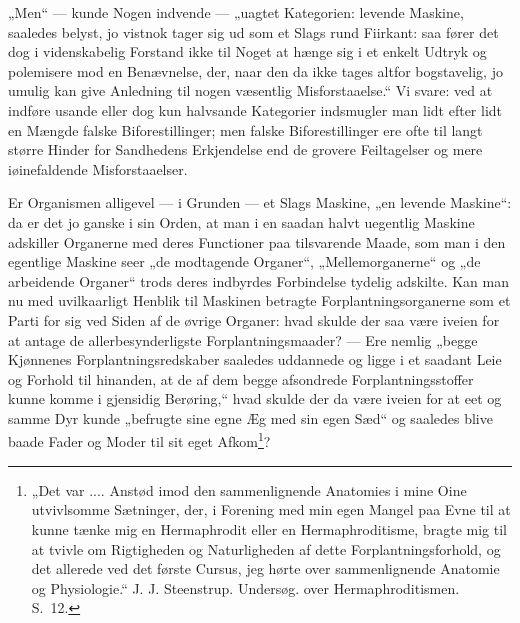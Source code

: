 \documentclass[11pt]{book}
\newcommand{\opage}[1]{\marginnote{\footnotesize\textit{[#1]}}}
\begin{document}
\opage{356} \setcounter{footnote}{0}%
„Men“ --- kunde Nogen indvende --- „uagtet Kategorien: levende
Maskine, saaledes belyst, jo vistnok tager sig ud som et Slags rund
Fiirkant: saa fører det dog i videnskabelig Forstand ikke til Noget at
hænge sig i et enkelt Udtryk og polemisere mod en Benævnelse, der,
naar den da ikke tages altfor bogstavelig, jo umulig kan give
Anledning til nogen væsentlig Misforstaaelse.“ Vi svare: ved at
indføre usande eller dog kun halvsande Kategorier indsmugler man lidt
efter lidt en Mængde falske Biforestillinger; men falske
Biforestillinger ere ofte til langt større Hinder for Sandhedens
Erkjendelse end de grovere Feiltagelser og mere iøinefaldende
Misforstaaelser.

\opage{357} \setcounter{footnote}{0}%
Er Organismen alligevel --- i Grunden --- et Slags Maskine, „en levende
Maskine“: da er det jo ganske i sin Orden, at man i en saadan halvt
uegentlig Maskine adskiller Organerne med deres Functioner paa
tilsvarende Maade, som man i den egentlige Maskine seer „de modtagende
Organer“, „Mellemorganerne“ og „de arbeidende Organer“ trods deres
indbyrdes Forbindelse tydelig adskilte. Kan man nu med uvilkaarligt
Henblik til Maskinen betragte Forplantningsorganerne som et Parti for
sig ved Siden af de øvrige Organer: hvad skulde der saa være iveien
for at antage de allerbesynderligste Forplantningsmaader? --- Ere
nemlig „begge Kjønnenes Forplantningsredskaber saaledes uddannede og
ligge i et saadant Leie og Forhold til hinanden, at de af dem begge
afsondrede Forplantningsstoffer kunne komme i gjensidig Berøring,“
hvad skulde der da være iveien for at eet og samme Dyr kunde
„befrugte sine egne Æg med sin egen Sæd“ og saaledes blive baade
Fader og Moder til sit eget Afkom\footnote{%
„Det var .... Anstød imod den sammenlignende Anatomies i mine Oine
utvivlsomme Sætninger, der, i Forening med min egen Mangel paa Evne
til at kunne tænke mig en Hermaphrodit eller en Hermaphroditisme,
bragte mig til at tvivle om Rigtigheden og Naturligheden af dette
Forplantningsforhold, og det allerede ved det første Cursus, jeg hørte
over sammenlignende Anatomie og Physiologie.“ J. J. Steenstrup.
Undersøg. over Hermaphroditismen. S.~12.
}?
\end{document}

